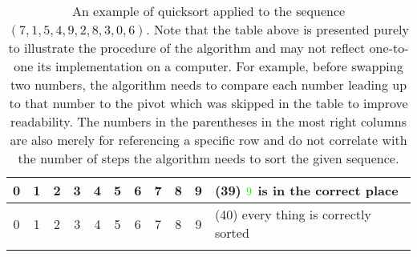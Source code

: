\begin{center}
\begin{longtable}{ | c | c | c | c | c | c | c | c | c | c || l | }
        \cellcolor{LightGreen}0 & \cellcolor{LightGreen}1 & \cellcolor{LightGreen}2 & \cellcolor{LightGreen}3 & \cellcolor{LightGreen}4 & \cellcolor{LightGreen}5 & \cellcolor{LightGreen}6 & \cellcolor{LightGreen}7 & \cellcolor{LightGreen}8 & \cellcolor{LightGreen}9 &(39) \(\color{green}9\) is in the correct place \\ \hline
        \cellcolor{LightGreen}0 & \cellcolor{LightGreen}1 & \cellcolor{LightGreen}2 & \cellcolor{LightGreen}3 & \cellcolor{LightGreen}4 & \cellcolor{LightGreen}5 & \cellcolor{LightGreen}6 & \cellcolor{LightGreen}7 & \cellcolor{LightGreen}8 & \cellcolor{LightGreen}9 &(40) every thing is correctly sorted \\ \hline
        \caption{An example of quicksort applied to the sequence \((7, 1, 5, 4, 9, 2, 8, 3, 0, 6)\). Note that the table above is presented purely to illustrate the procedure of the algorithm and may not reflect one-to-one its implementation on a computer. For example, before swapping two numbers, the algorithm needs to compare each number leading up to that number to the pivot which was skipped in the table to improve readability. The numbers in the parentheses in the most right columns are also merely for referencing a specific row and do not correlate with the number of steps the algorithm needs to sort the given sequence.} \\
    \end{longtable}
\end{center}

